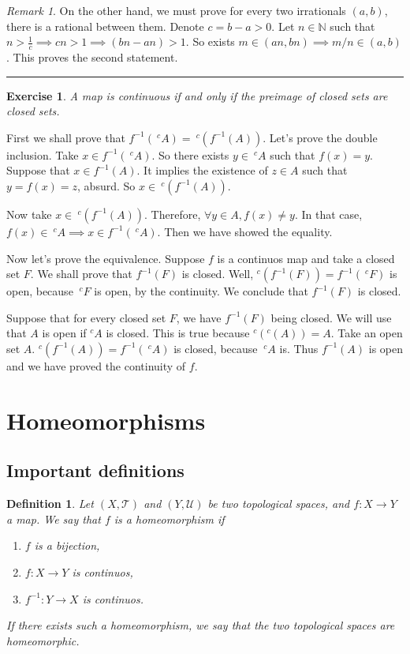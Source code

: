 \documentclass[a4paper,11pt]{article}
\newcommand{\linia}{\rule{\linewidth}{0.5pt}}
\theoremstyle{mytheor}
\newtheorem{definition}{Definition}[subsection]
\theoremstyle{mytheor}
\newtheorem{exercise}{Exercise}
\theoremstyle{remark}
\newtheorem*{remark}{Remark}
\newcommand{\T}{\mathcal{T}}
\newcommand{\U}{\mathcal{U}}
\begin{document}
\begin{enumerate}
\begin{remark}
        On the other hand, we must prove for every two irrationals $(a,b)$,
        there is a rational between them. Denote $c = b - a > 0$. Let $n\in
        \mathbb{N}$ such that $n > \frac{1}{c} \implies cn > 1 \implies (bn -
        an) > 1$. So exists $m \in (an, bn) \implies m/n \in (a,b)$. This
        proves the second statement.   
    \end{remark}
\end{enumerate}

\noindent\linia

\begin{exercise}
    A map is continuous if and only if the preimage of closed sets are closed sets.
\end{exercise}

First we shall prove that $f^{-1}(~^cA) = ~^c(f^{-1}(A))$. Let's prove the
double inclusion. Take $x \in f^{-1}(~^cA)$. So there exists $y \in ~^cA$ such
that $f(x) = y$. Suppose that $x \in f^{-1}(A)$. It implies the existence of
$z \in A$ such that $y = f(x) = z$, absurd. So $x \in ~^c(f^{-1}(A))$.

Now take $x \in ~^c(f^{-1}(A))$. Therefore, $\forall y \in A, f(x) \neq y$. In
that case, $f(x) \in ~^cA \implies x \in f^{-1}(~^cA)$. Then we have showed
the equality. 

\vspace{5mm}

Now let's prove the equivalence. Suppose $f$ is a continuos map and take a
closed set $F$. We shall prove that $f^{-1}(F)$ is closed. Well, $^c(f^{-1}(F))
= f^{-1}(~^cF)$ is open, because $~^cF$ is open, by the continuity. We
conclude that $f^{-1}(F)$ is closed. 

Suppose that for every closed set $F$, we have $f^{-1}(F)$ being closed. We
will use that $A$ is open if $^cA$ is closed. This is true because $^c(^c(A))
= A$. Take an open set $A$. $^c(f^{-1}(A)) = f^{-1}(~^cA)$
is closed, because $~^cA$ is. Thus $f^{-1}(A)$ is open and we have proved the
continuity of $f$. 


\section{Homeomorphisms}

\subsection{Important definitions}

\begin{definition}
    Let $(X, \T)$ and $(Y, \U)$ be two topological spaces, and $f : X
    \to Y$ a map. We say that $f$ is a homeomorphism if
    \begin{enumerate}
        \item $f$ is a bijection, 
        \item $f : X \to Y$ is continuos, 
        \item $f^{-1} : Y \to X$ is continuos.
    \end{enumerate}
    If there exists such a homeomorphism, we say that the two topological
    spaces are homeomorphic.
\end{definition}
\end{document}
